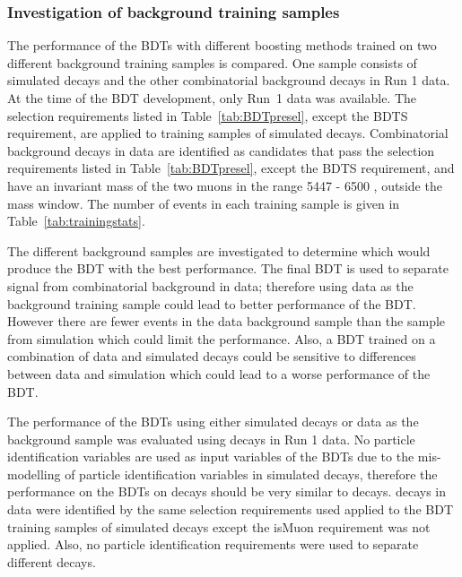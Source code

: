 \subsubsection{Investigation of background training samples}
\label{sec:pref}
The performance of the BDTs with different boosting methods trained on two different background training samples is compared. 
One sample consists of simulated \bbbarmumux decays and the other combinatorial background decays in Run 1 data. At the time of the BDT development, only Run~1 data was available. The selection requirements listed in Table~\ref{tab:BDTpresel}, except the BDTS requirement, are applied to training samples of simulated decays. Combinatorial background decays in data are identified as \bsmumu candidates that pass the selection requirements listed in Table~\ref{tab:BDTpresel}, except the BDTS requirement, and have an invariant mass of the two muons in the range 5447 - 6500 \mevcc, outside the \bs mass window. The number of events in each training sample is given in Table~\ref{tab:trainingstats}.



The different background samples are investigated to determine which would produce the BDT with the best performance. The final BDT is used to separate signal from combinatorial background in data; therefore using data as the background training sample could lead to better performance of the BDT. However there are fewer events in the data background sample than the sample from simulation which could limit the performance. Also, a BDT trained on a combination of data and simulated decays could be sensitive to differences between data and simulation which could lead to a worse performance of the BDT.


The performance of the BDTs using either simulated decays or data as the background sample was evaluated using \bhh decays in Run 1 data. No particle identification variables are used as input variables of the BDTs due to the mis-modelling of particle identification variables in simulated decays, therefore the performance on the BDTs on \bhh decays should be very similar to \bsmumu decays. \bhh decays in data were identified by the same selection requirements used applied to the BDT training samples of simulated decays except the isMuon requirement was not applied. Also, no particle identification requirements were used to separate different \bhh decays. 


